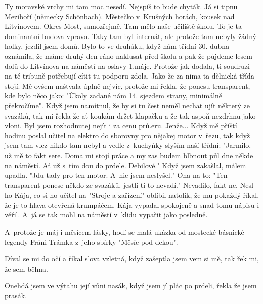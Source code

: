 

Ty moravské vrchy mi tam moc nesedí. Nejspíš to bude chyták. Já si
tipnu Meziboří (německy Schönbach). Městečko v~Krušných horách, kousek
nad Litvínovem. Okres Most, samozřejmě. Tam mělo naše učiliště školu.
To je ta dominantní budova vpravo. Taky tam byl internát, ale protože
tam nebyly žádný holky, jezdil jsem domů. Bylo to ve druháku, když nám
třídní 30. dubna oznámila, že máme druhý den ráno naklusat před školu
a pak že půjdeme lesem dolů do Litvínova na náměstí na oslavy 1.máje.
Protože jak dodala, ti soudruzi na té tribuně potřebují cítit tu
podporu zdola. Jako že za nima ta dělnická třída stojí. Mě ovšem
naštvala úplně nejvíc, protože mi řekla, že ponesu transparent, kde
bylo něco jako: "Úkoly zadané nám 14. sjezdem strany, minimálně
překročíme". Když jsem namítnul, že by si tu čest neměl nechat ujít
některý ze svazáků, tak mi řekla že ať koukám držet klapačku a že tak
aspoň nezdrhnu jako vloni. Byl jsem rozhodnutej nejít i za cenu
prů.eru. Jenže... Když mě příští hodinu poslal učitel na elektro do
sborovny pro nějakej motor v~řezu, tak když jsem tam vlez nikdo tam
nebyl a vedle z~kuchyňky slyším naší třídní: "Jarmilo, už mě to fakt
sere. Doma mi stojí práce a my zas budem blbnout půl dne někde na
náměstí. Ať už s~tím dou do prdele. Debilové." Když jsem zakašlal,
málem upadla. "Jdu tady pro ten motor. A~nic jsem neslyšel." Ona na
to: "Ten transparent ponese někdo ze svazáků, jestli ti to nevadí."
Nevadilo, fakt ne. Nesl ho Kája, co si ho učitel na "Stroje a
zařízení" oblíbil natolik, že mu pokaždý říkal, že je to hlava
otevřená krumpáčem. Kája vypadal spokojeně a snad tomu nápisu i věřil.
A~já se tak mohl na náměstí v~klidu vypařit jako posledně.

A~protože je máj i měsícem lásky, hodí se malá ukázka od mostecké
básnické legendy Fráni Trámka z~jeho sbírky "Měsíc pod dekou".

Díval se mi do očí
a říkal slova vzletná,
když zašeptla jsem vem si mě,
tak řek mi, že sem běhna.

Onehdá jsem ve výtahu její vůni nasák,
když jsem jí plác po prdeli,
řekla že jsem prasák.
